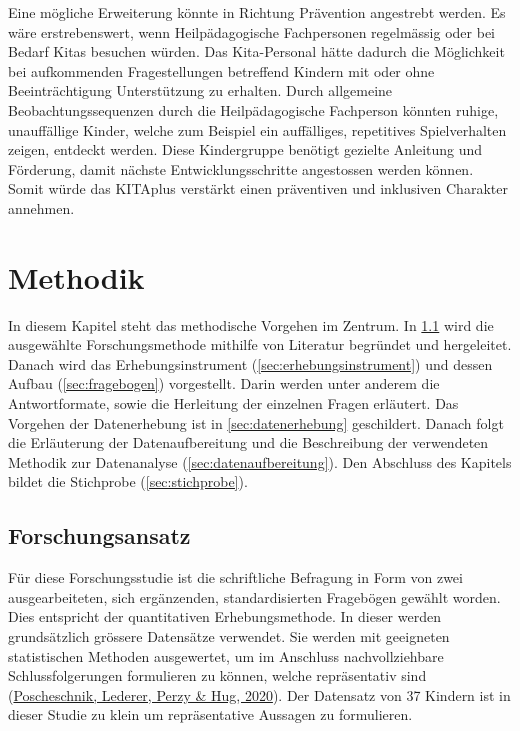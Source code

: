 \documentclass[
  ngerman,
  11pt,
  paper=a4,
  twoside,
  titlepage=true,
  openright,
  abstract=on,
  toc=listofnumbered,
  numbers=noenddot,
  chapterprefix=true,
  headings=optiontohead,
  svgnames,
  dvipsnames]{scrreprt}
\begin{document}
Eine mögliche Erweiterung könnte in Richtung Prävention angestrebt
werden. Es wäre erstrebenswert, wenn Heilpädagogische Fachpersonen
regelmässig oder bei Bedarf Kitas besuchen würden. Das Kita-Personal
hätte dadurch die Möglichkeit bei aufkommenden Fragestellungen
betreffend Kindern mit oder ohne Beeinträchtigung Unterstützung zu
erhalten. Durch allgemeine Beobachtungssequenzen durch die
Heilpädagogische Fachperson könnten ruhige, unauffällige Kinder, welche
zum Beispiel ein auffälliges, repetitives Spielverhalten zeigen,
entdeckt werden. Diese Kindergruppe benötigt gezielte Anleitung und
Förderung, damit nächste Entwicklungsschritte angestossen werden können.
Somit würde das KITAplus verstärkt einen präventiven und inklusiven
Charakter annehmen.

\hypertarget{sec:forschungsmethode}{%
\chapter{Methodik}\label{sec:forschungsmethode}}

In diesem Kapitel steht das methodische Vorgehen im Zentrum. In
\cref{sec:forschungsansatz} wird die ausgewählte Forschungsmethode
mithilfe von Literatur begründet und hergeleitet. Danach wird das
Erhebungsinstrument (\cref{sec:erhebungsinstrument}) und dessen Aufbau
(\cref{sec:fragebogen}) vorgestellt. Darin werden unter anderem die
Antwortformate, sowie die Herleitung der einzelnen Fragen erläutert. Das
Vorgehen der Datenerhebung ist in \cref{sec:datenerhebung} geschildert.
Danach folgt die Erläuterung der Datenaufbereitung und die Beschreibung
der verwendeten Methodik zur Datenanalyse
(\cref{sec:datenaufbereitung}). Den Abschluss des Kapitels bildet die
Stichprobe (\cref{sec:stichprobe}).

\hypertarget{sec:forschungsansatz}{%
\section{Forschungsansatz}\label{sec:forschungsansatz}}

Für diese Forschungsstudie ist die schriftliche Befragung in Form von
zwei ausgearbeiteten, sich ergänzenden, standardisierten Fragebögen
gewählt worden. Dies entspricht der quantitativen Erhebungsmethode. In
dieser werden grundsätzlich grössere Datensätze verwendet. Sie werden
mit geeigneten statistischen Methoden ausgewertet, um im Anschluss
nachvollziehbare Schlussfolgerungen formulieren zu können, welche
repräsentativ sind (\protect\hyperlink{ref-hug2020}{Poscheschnik,
Lederer, Perzy \& Hug, 2020}). Der Datensatz von 37 Kindern ist in
dieser Studie zu klein um repräsentative Aussagen zu formulieren.
\end{document}
